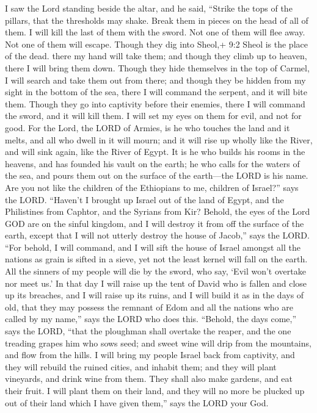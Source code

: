  I saw the Lord standing beside the altar, and he said,
``Strike the tops of the pillars, that the thresholds may shake. Break
them in pieces on the head of all of them. I will kill the last of them
with the sword. Not one of them will flee away. Not one of them will
escape.  Though they dig into Sheol,+ 9:2 Sheol is the place
of the dead. there my hand will take them; and though they climb up to
heaven, there I will bring them down.  Though they hide
themselves in the top of Carmel, I will search and take them out from
there; and though they be hidden from my sight in the bottom of the sea,
there I will command the serpent, and it will bite them. 
Though they go into captivity before their enemies, there I will command
the sword, and it will kill them. I will set my eyes on them for evil,
and not for good.  For the Lord, the LORD of Armies, is he
who touches the land and it melts, and all who dwell in it will mourn;
and it will rise up wholly like the River, and will sink again, like the
River of Egypt.  It is he who builds his rooms in the
heavens, and has founded his vault on the earth; he who calls for the
waters of the sea, and pours them out on the surface of the earth---the
LORD is his name.  Are you not like the children of the
Ethiopians to me, children of Israel?'' says the LORD. ``Haven't I
brought up Israel out of the land of Egypt, and the Philistines from
Caphtor, and the Syrians from Kir?  Behold, the eyes of the
Lord GOD are on the sinful kingdom, and I will destroy it from off the
surface of the earth, except that I will not utterly destroy the house
of Jacob,'' says the LORD.  ``For behold, I will command,
and I will sift the house of Israel amongst all the nations as grain is
sifted in a sieve, yet not the least kernel will fall on the earth.
 All the sinners of my people will die by the sword, who
say, `Evil won't overtake nor meet us.'  In that day I will
raise up the tent of David who is fallen and close up its breaches, and
I will raise up its ruins, and I will build it as in the days of old,
 that they may possess the remnant of Edom and all the
nations who are called by my name,'' says the LORD who does this.
 ``Behold, the days come,'' says the LORD, ``that the
ploughman shall overtake the reaper, and the one treading grapes him who
sows seed; and sweet wine will drip from the mountains, and flow from
the hills.  I will bring my people Israel back from
captivity, and they will rebuild the ruined cities, and inhabit them;
and they will plant vineyards, and drink wine from them. They shall also
make gardens, and eat their fruit.  I will plant them on
their land, and they will no more be plucked up out of their land which
I have given them,'' says the LORD your God.
